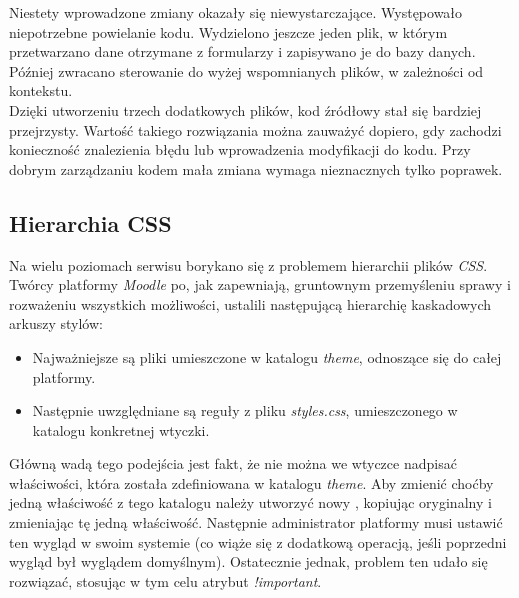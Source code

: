 Niestety wprowadzone zmiany okazały się niewystarczające. Występowało niepotrzebne powielanie kodu. Wydzielono jeszcze jeden plik, w którym przetwarzano dane otrzymane z formularzy i zapisywano je do bazy danych. Później zwracano sterowanie do wyżej wspomnianych plików, w zależności od kontekstu. \\

Dzięki utworzeniu trzech dodatkowych plików, kod źródłowy stał się bardziej przejrzysty. Wartość takiego rozwiązania można zauważyć dopiero, gdy zachodzi konieczność znalezienia błędu lub wprowadzenia modyfikacji do kodu. Przy dobrym zarządzaniu kodem mała zmiana wymaga nieznacznych tylko poprawek.

\subsection{Hierarchia CSS}
\label{Chapter62a}

Na wielu poziomach serwisu borykano się z problemem hierarchii plików \textit{CSS}. Twórcy platformy \textit{Moodle} po, jak zapewniają, gruntownym przemyśleniu sprawy i rozważeniu wszystkich możliwości, ustalili następującą hierarchię kaskadowych arkuszy stylów:

\begin{itemize}
\item Najważniejsze są pliki umieszczone w katalogu \textit{theme}, odnoszące się do całej platformy.
\item Następnie uwzględniane są reguły z pliku \textit{styles.css}, umieszczonego w katalogu konkretnej wtyczki.
\end{itemize}

Główną wadą tego podejścia jest fakt, że nie można we wtyczce nadpisać właściwości, która została zdefiniowana w katalogu \textit{theme}. Aby zmienić choćby jedną właściwość z tego katalogu należy utworzyć nowy , kopiując oryginalny i zmieniając tę jedną właściwość. Następnie administrator platformy musi ustawić ten wygląd w swoim systemie (co wiąże się z dodatkową operacją, jeśli poprzedni wygląd był wyglądem domyślnym). Ostatecznie jednak, problem ten udało się rozwiązać, stosując w tym celu atrybut \textit{!important}.